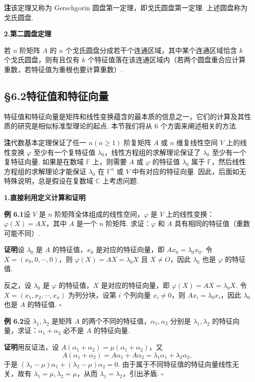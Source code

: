 \documentclass[UTF8,12pt,a4paper,fontset=fandol]{ctexart}
\begin{document}
\noindent\textbf{注}\quad 该定理又称为 Gerschgorin 圆盘第一定理，即戈氏圆盘第一定理. 上述圆盘称为戈氏圆盘.

\noindent\textbf{2.\quad 第二圆盘定理}

若 $n$ 阶矩阵 $A$ 的 $n$ 个戈氏圆盘分成若干个连通区域，其中某个连通区域恰含 $k$ 个戈氏圆盘，则有且仅有 $k$ 个特征值落在该连通区域内（若两个圆盘重合应计算重数，若特征值为重根也要计算重数）.

\subsection*{§6.2\quad 特征值和特征向量}

特征值和特征向量是矩阵和线性变换蕴含的最本质的信息之一，它们的计算及其性质的研究是相似标准型理论的起点. 本节我们将从 6 个方面来阐述相关的方法.

\noindent\textbf{注}\quad 代数基本定理保证了任一 $n(n\ge 1)$ 阶复矩阵 $A$ 或 $n$ 维复线性空间 $V$ 上的线性变换 $\varphi$ 至少有一个复特征值 $\lambda_0$，线性方程组的求解理论保证了 $\lambda_0$ 至少有一个复特征向量. 如果是在数域 $\mathbb{F}$ 上，则需要 $A$ 或 $\varphi$ 的特征值 $\lambda_0$ 属于 $\mathbb{F}$，然后线性方程组的求解理论才能保证 $\lambda_0$ 在 $\mathbb{F}^n$ 或 $V$ 中有对应的特征向量. 因此，后面如无特殊说明，总是假设在复数域 $\mathbb{C}$ 上考虑问题.

\noindent\textbf{1.\quad 直接利用定义计算和证明}

\noindent\textbf{例 6.1}\quad 设 $V$ 是 $n$ 阶矩阵全体组成的线性空间，$\varphi$ 是 $V$ 上的线性变换：$\varphi(X)=AX$，其中 $A$ 是一个 $n$ 阶矩阵. 求证：$\varphi$ 和 $A$ 具有相同的特征值（重数可能不同）.

\noindent\textbf{证明}\quad 设 $\lambda_0$ 是 $A$ 的特征值，$x_0$ 是对应的特征向量，即 $Ax_0=\lambda_0x_0$. 令 $X=(x_0,0,\cdots,0)$，则 $\varphi(X)=AX=\lambda_0X$ 且 $X\ne O$，因此 $\lambda_0$ 也是 $\varphi$ 的特征值.

反之，设 $\lambda_0$ 是 $\varphi$ 的特征值，$X$ 是对应的特征向量，即 $\varphi(X)=AX=\lambda_0X$. 令 $X=(x_1,x_2,\cdots,x_n)$ 为列分块，设第 $i$ 个列向量 $x_i\ne 0$，则 $Ax_i=\lambda_0x_i$，因此 $\lambda_0$ 也是 $A$ 的特征值. $\square$

\noindent\textbf{例 6.2}\quad 设 $\lambda_1,\lambda_2$ 是矩阵 $A$ 的两个不同的特征值，$\alpha_1,\alpha_2$ 分别是 $\lambda_1,\lambda_2$ 的特征向量，求证：$\alpha_1+\alpha_2$ 必不是 $A$ 的特征向量.

\noindent\textbf{证明}\quad 用反证法，设 $A(\alpha_1+\alpha_2)=\mu(\alpha_1+\alpha_2)$，又
\[
A(\alpha_1+\alpha_2)=A\alpha_1+A\alpha_2=\lambda_1\alpha_1+\lambda_2\alpha_2,
\]
于是 $(\lambda_1-\mu)\alpha_1+(\lambda_2-\mu)\alpha_2=0$. 由于属于不同特征值的特征向量线性无关，故有 $\lambda_1=\mu,\lambda_2=\mu$，从而 $\lambda_1=\lambda_2$，引出矛盾. $\square$
\end{document}
